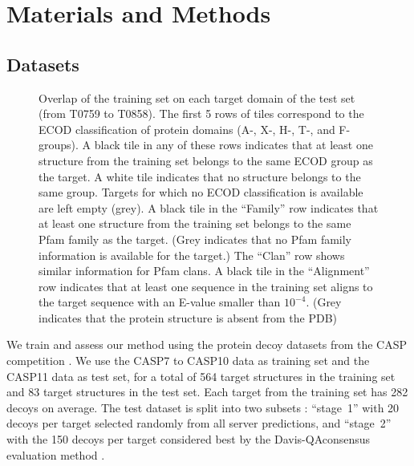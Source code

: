 \documentclass{bioinfo}
\begin{document}
\section{Materials and Methods}

\subsection{Datasets}
\begin{figure}[!tpb]
    \caption{Overlap of the training set on each target domain of the
    test set (from T0759 to T0858). The first 5 rows of tiles
    correspond to the ECOD classification of protein domains (A-, X-,
    H-, T-, and F-groups). A black tile in any of these rows indicates
    that at least one structure from the training set belongs to the
    same ECOD group as the target. A white tile indicates that no
    structure belongs to the same group. Targets for which no ECOD
    classification is available are left empty (grey).
    A black tile in the ``Family'' row indicates that at least one
    structure from the training set belongs to the same Pfam family as
    the target. (Grey indicates that no Pfam family information is
    available for the target.) The ``Clan'' row shows similar
    information for Pfam clans. A black tile in the ``Alignment'' row
    indicates that at least one sequence in the training set aligns to
    the target sequence with an E-value smaller than $10^{-4}$. (Grey
    indicates that the protein structure is absent from the PDB)}
    \label{Fig:summaryTable}
\end{figure}
We train and assess our method using the protein decoy datasets from
the CASP competition \citep{moult2014critical}.  We use the CASP7 to
CASP10 data as training set and the CASP11 data as test set, for a
total of 564 target structures in the training set and 83 target
structures in the test set. Each target from the training set has 282
decoys on average.
The test dataset is split into two subsets \citep{kryshtafovych2015}:
``stage~1'' with 20 decoys per target selected randomly from all
server predictions, and ``stage~2'' with the 150 decoys per target
considered best by the Davis-QAconsensus evaluation
method \citep{kryshtafovych2015}.
\end{document}
